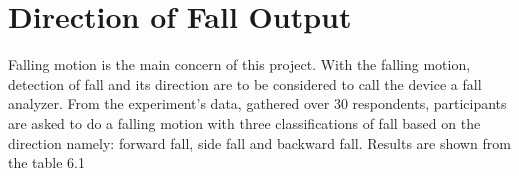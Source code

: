 \section{Direction of Fall Output}

Falling motion is the main concern of this project. With the falling motion, detection of fall and its direction are to be considered to call the device a fall analyzer. From the experiment’s data, gathered over 30 respondents, participants are asked to do a falling motion with three classifications of fall based on the direction namely: forward fall, side fall and backward fall. Results are shown from the table 6.1

\begin{table}[htbp]
  \centering
  \caption{Falling Motions Data}
\end{table}
